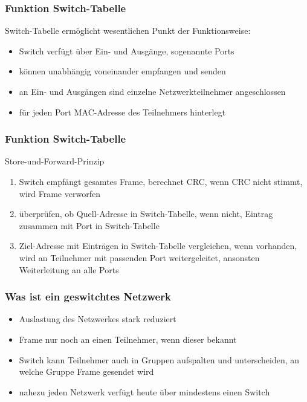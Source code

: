 \documentclass{beamer}
\begin{document}
        \begin{frame}
        	\frametitle{Funktion Switch-Tabelle}
        	Switch-Tabelle ermöglicht wesentlichen Punkt der Funktionsweise:
        	\begin{itemize}
        	\item Switch verfügt über Ein- und Ausgänge, sogenannte Ports
        	\item können unabhängig voneinander empfangen und senden
        	\item an Ein- und Ausgängen sind einzelne Netzwerkteilnehmer angeschlossen
        	\item für jeden Port MAC-Adresse des Teilnehmers hinterlegt
        	\end{itemize}  	
    	\end{frame}
    	
    	\begin{frame}
	       	\frametitle{Funktion Switch-Tabelle}
	       	Store-und-Forward-Prinzip
	       	\begin{enumerate}
	       	\item Switch empfängt gesamtes Frame, berechnet CRC, wenn CRC nicht stimmt, wird Frame verworfen
	       	\item überprüfen, ob Quell-Adresse in Switch-Tabelle, wenn nicht, Eintrag zusammen mit Port in Switch-Tabelle
	       	\item Ziel-Adresse mit Einträgen in Switch-Tabelle vergleichen, wenn vorhanden, wird an Teilnehmer mit passenden Port weitergeleitet, ansonsten Weiterleitung an alle Ports
	       	\end{enumerate}  	
	   	\end{frame}
    	
        \begin{frame}
        	\frametitle{Was ist ein geswitchtes Netzwerk}
        	\begin{itemize}
        	\item Auslastung des Netzwerkes stark reduziert
        	\item Frame nur noch an einen Teilnehmer, wenn dieser bekannt
        	\item Switch kann Teilnehmer auch in Gruppen aufspalten und unterscheiden, an welche Gruppe Frame gesendet wird
        	\item nahezu jeden Netzwerk verfügt heute über mindestens einen Switch
        	\end{itemize} 	
    	\end{frame}
    	
\end{document}
